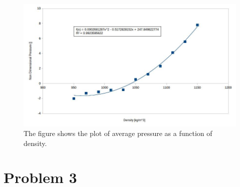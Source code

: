 \documentclass{article}
\begin{document}
\begin{figure}[htb]
\centering
\includegraphics[width=.9\linewidth]{./HM4-P2a.jpg}
\caption{\label{fig:P2a}The figure shows the plot of average pressure as a function of density.}
\end{figure}



\section{Problem 3}
\label{sec-3}
\end{document}
